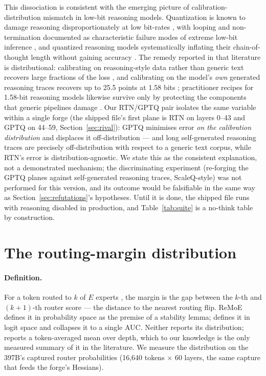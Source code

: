 \documentclass[10pt]{article} %
\begin{document}
This dissociation is consistent with the emerging picture of
calibration-distribution mismatch in low-bit reasoning models. Quantization
is known to damage reasoning disproportionately at low bit-rates
\citep{liu2025quantreasoning}, with looping and non-termination documented as
characteristic failure modes of extreme low-bit inference
\citep{alimaskina2026lowbit}, and quantized reasoning models systematically
inflating their chain-of-thought length without gaining accuracy
\citep{lotfi2026overthink}. The remedy reported in that literature is
distributional: calibrating on reasoning-style data rather than generic text
recovers large fractions of the loss \citep{liu2025quantreasoning}, and
calibrating on the model's \emph{own} generated reasoning traces recovers up
to 25.5 points at 1.58 bits \citep{wang2026scaleq}; practitioner recipes for
1.58-bit reasoning models likewise survive only by protecting the components
that generic pipelines damage \citep{unsloth2025r1dynamic}. Our RTN/GPTQ pair
isolates the same variable within a single forge (the shipped file's first
plane is RTN on layers 0--43 and GPTQ on 44--59, Section~\ref{sec:rival}):
GPTQ minimises error
\emph{on the calibration distribution} and displaces it off-distribution ---
and long self-generated reasoning traces are precisely off-distribution with
respect to a generic text corpus, while RTN's error is
distribution-agnostic. We state this as the consistent explanation, not a
demonstrated mechanism; the discriminating experiment (re-forging the GPTQ
planes against self-generated reasoning traces, ScaleQ-style) was not
performed for this version, and its outcome would be falsifiable in the same
way as Section~\ref{sec:refutations}'s
hypotheses. Until it is done, the shipped file runs with reasoning disabled in
production, and Table~\ref{tab:suite} is a no-think table by construction.

\section{The routing-margin distribution}
\label{sec:margin}

\paragraph{Definition.} For a token routed to $k$ of $E$ experts \citep{switch}, the margin is the gap
between the $k$-th and $(k+1)$-th router score --- the distance to the nearest
routing flip. ReMoE \citep{zhu2026remoe} defines it in probability space as the premise of a
stability lemma; \citet{gu2026routeflip} defines it in logit space and collapses it
to a single AUC. Neither reports its distribution; \citet{chen2026certainhead} reports
a token-averaged mean over depth, which to our knowledge is the only measured
summary of it in the literature. We measure the distribution on the 397B's
captured router probabilities (16{,}640 tokens $\times$ 60 layers, the same capture
that feeds the forge's Hessians).
\end{document}
